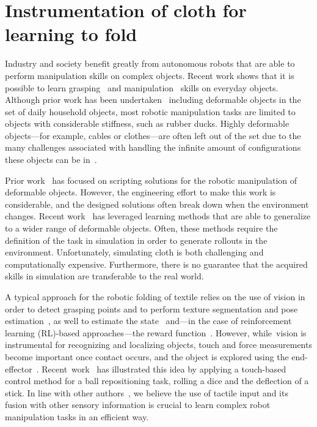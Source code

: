 \documentclass[\home/main.tex]{subfiles}
\begin{document}

\chapter{Instrumentation of cloth for learning to fold}\label{ch:instrumentation}

Industry and society benefit greatly from autonomous robots that are able to perform manipulation skills on complex objects. Recent work shows that it is possible to learn grasping~\cite{Levine2018, Morrison2018} and manipulation~\cite{Agrawal2016, Gu2017} skills on everyday objects. Although prior work has been undertaken~\cite{Levine2018} including deformable objects in the set of daily household objects, most robotic manipulation tasks are limited to objects with considerable stiffness, such as rubber ducks. Highly deformable objects---for example, cables or clothes---are often left out of the set due to the many challenges associated with handling the infinite amount of configurations these objects can be in~\cite{Foresti2004}.

Prior work~\cite{Saha2007, Maitin2010, Doumanoglou2016} has focused on scripting solutions for the robotic manipulation of deformable objects. However, the engineering effort to make this work is considerable, and the designed solutions often break down when the environment changes. Recent work~\cite{Matas2018, Seita2018} has leveraged learning methods that are able to generalize to a wider range of deformable objects. Often, these methods require the definition of the task in simulation in order to generate rollouts in the environment. Unfortunately, simulating cloth is both challenging and computationally expensive. Furthermore, there is no guarantee that the acquired skills in simulation are transferable to the real world. \par

A typical approach for the robotic folding of textile relies on the use of vision in order to detect grasping points and to perform texture segmentation and pose estimation~\cite{Maitin2010, Doumanoglou2016, Bersch2011}, as well to estimate the state~\cite{Matas2018} and---in the case of reinforcement learning (RL)-based approaches---the reward function~\cite{Tsurumine2019}. However, while~vision is instrumental for recognizing and localizing objects, touch and force measurements become important once contact occurs, and the object is explored using the end-effector~\cite{Billard2019}. Recent~work~\cite{Tian2019} has illustrated this idea by applying a touch-based control method for a ball repositioning task, rolling a dice and the deflection of a stick. In line with other authors~\cite{Tian2019, Lee2019}, we believe the use of tactile input and its fusion with other sensory information is crucial to learn complex robot manipulation tasks in an efficient way. \par
\end{document}
